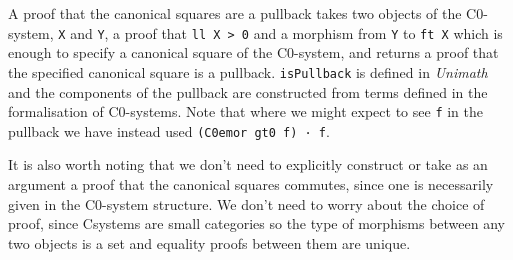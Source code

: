 A proof that the canonical squares are a pullback takes two objects of the
C0-system, \verb|X| and \verb|Y|, a proof that \verb|ll X > 0| and a morphism
from \verb|Y| to \verb|ft X| which is enough to specify a canonical square of
the C0-system, and returns a proof that the specified canonical square is a
pullback. \verb|isPullback| is defined in \textit{Unimath} and the components of
the pullback are constructed from terms defined in the formalisation of
C0-systems. Note that where we might expect to see \verb|f| in the pullback we
have instead used \verb|(C0emor gt0 f) · f|.

It is also worth noting that we don't need to explicitly construct or take as an
argument a proof that the canonical squares commutes, since one is necessarily
given in the C0-system structure. We don't need to worry about the choice of
proof, since Csystems are small categories so the type of morphisms between any
two objects is a set and equality proofs between them are unique.